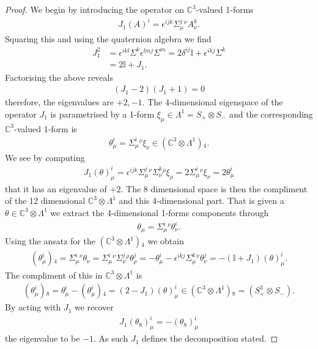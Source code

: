 \documentclass[10pt]{report}
\theoremstyle{definition}
\newcommand{\C}[0]{\mathbb{C}}
\newcommand{\E}[0]{\C^3}
\begin{document}
\begin{proof}
    We begin by introducing the operator on $\E$-valued 1-forms
    \begin{align} \label{eq:J1-operator-definition}
        J_1 (A)^i = \epsilon^{ijk} \Sigma^j_\mu{}^\nu A^k_\nu.
    \end{align}
    Squaring this and using the quaternion algebra we find 
    \begin{align}
        J_1^2 & = \epsilon^{ikl} \Sigma^k \epsilon^{lmj} \Sigma^m = 2 \delta^{ij} \mathbb{I} + \epsilon^{ikj} \Sigma^k  \nonumber\\& = 2\mathbb{I} + J_1.
    \end{align}
    Factorising the above reveals
    \begin{align}
        (J_1 - 2)(J_1 + 1) = 0
    \end{align}
    therefore, the eigenvalues are $+2,-1$. The 4-dimensional eigenspace of the operator $J_1$ is parametrised by a 1-form $\xi_\mu \in \Lambda^1 = S_+ \otimes S_-$ and the corresponding $\E$-valued 1-form is 
    \begin{align}
        \theta^i_\mu = \Sigma^i_\mu{}^\nu \xi_\nu \in (\E \otimes \Lambda^1){}_4.
    \end{align}
    We see by computing 
    \begin{align}
        J_1(\theta)^i_\mu = \epsilon^{ijk} \Sigma^j_\mu{}^\nu \Sigma^k_\nu{}^\rho \xi_\rho = 2 \Sigma^i_\mu{}^\nu \xi_\nu = 2 \theta^i_\mu
    \end{align}
    that it has an eigenvalue of $+2$. The 8 dimensional space is then the compliment of the 12 dimensional $\E \otimes \Lambda^1$ and this 4-dimensional part. That is given a $\theta \in \E \otimes \Lambda^1$ we extract the 4-dimensional 1-forms components through 
    \begin{align}
        \theta_\mu = \Sigma^i_\mu{}^\nu \theta^i_\nu. \label{eq:pleb-4-projection-of-E-1-forms}
    \end{align}
    Using the ansatz for the $(\E \otimes \Lambda^1){}_4$ we obtain 
    \begin{align}
        (\theta^i_\mu){}_4 = \Sigma^i_\mu{}^\nu \theta_\nu = \Sigma^i_\mu{}^\nu \Sigma^j_\nu{}^\rho \theta^j_\rho = -\theta^i_\mu - \epsilon^{ikj} \Sigma^k_\mu{}^\nu \theta^j_\nu = -(\mathbb{I} + J_1)(\theta)^i_\mu. \label{eq:pleb-4-embedding-into-E-1-forms}
    \end{align}
    The compliment of this in $\E \otimes \Lambda^1$ is 
    \begin{align}
        (\theta^i_\mu){}_8 = \theta^i_\mu - (\theta^i_\mu){}_4 = (2 - J_1)(\theta)^i_\mu \in (\E \otimes \Lambda^1){}_8 = (S_+^3 \otimes S_-).
    \end{align}
    By acting with $J_1$ we recover 
    \begin{align}
        J_1(\theta_8)^i_\mu = - (\theta_8)^i_\mu
    \end{align}
    the eigenvalue to be $-1$. As such $J_1$ defines the decomposition stated.
\end{proof}
\end{document}
